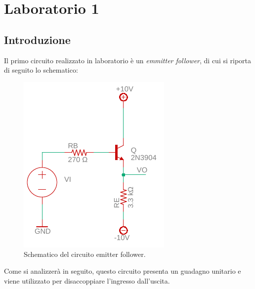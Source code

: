 \chapter{Laboratorio 1}
\section{Introduzione}
Il primo circuito realizzato in laboratorio è un \textit{emmitter follower}, di cui si riporta di seguito lo schematico:
\begin{figure}[h!]
	\centering
	\includegraphics[width=0.4\linewidth]{./OtherFiles/Laboratorio 1/emitter follower}
	\caption{Schematico del circuito emitter follower.}
	\label{fig:emitterfollwer}
\end{figure}

\noindent
Come si analizzerà in seguito, questo circuito presenta un guadagno unitario e viene utilizzato per disaccoppiare l'ingresso dall'uscita.

